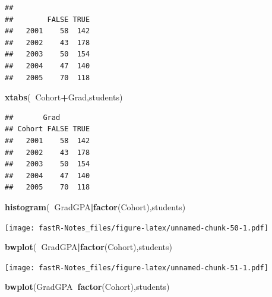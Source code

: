 \documentclass[]{book}
\newenvironment{Shaded}{\begin{snugshade}}{\end{snugshade}}
\newcommand{\KeywordTok}[1]{\textcolor[rgb]{0.13,0.29,0.53}{\textbf{#1}}}
\newcommand{\OperatorTok}[1]{\textcolor[rgb]{0.81,0.36,0.00}{\textbf{#1}}}
\newcommand{\NormalTok}[1]{#1}
\theoremstyle{definition}
\theoremstyle{definition}
\theoremstyle{definition}
\theoremstyle{remark}
\begin{document}
\begin{Shaded}
\end{Shaded}

\begin{verbatim}
##       
##        FALSE TRUE
##   2001    58  142
##   2002    43  178
##   2003    50  154
##   2004    47  140
##   2005    70  118
\end{verbatim}

\begin{Shaded}
\begin{Highlighting}[]
\KeywordTok{xtabs}\NormalTok{(}\OperatorTok{~}\NormalTok{Cohort}\OperatorTok{+}\NormalTok{Grad,students)}
\end{Highlighting}
\end{Shaded}

\begin{verbatim}
##       Grad
## Cohort FALSE TRUE
##   2001    58  142
##   2002    43  178
##   2003    50  154
##   2004    47  140
##   2005    70  118
\end{verbatim}

\begin{Shaded}
\begin{Highlighting}[]
\KeywordTok{histogram}\NormalTok{(}\OperatorTok{~}\NormalTok{GradGPA}\OperatorTok{|}\KeywordTok{factor}\NormalTok{(Cohort),students)}
\end{Highlighting}
\end{Shaded}

\texttt{[image: fastR-Notes\_files/figure-latex/unnamed-chunk-50-1.pdf]}

\begin{Shaded}
\begin{Highlighting}[]
\KeywordTok{bwplot}\NormalTok{(}\OperatorTok{~}\NormalTok{GradGPA}\OperatorTok{|}\KeywordTok{factor}\NormalTok{(Cohort),students)}
\end{Highlighting}
\end{Shaded}

\texttt{[image: fastR-Notes\_files/figure-latex/unnamed-chunk-51-1.pdf]}

\begin{Shaded}
\begin{Highlighting}[]
\KeywordTok{bwplot}\NormalTok{(GradGPA}\OperatorTok{~}\KeywordTok{factor}\NormalTok{(Cohort),students)}
\end{Highlighting}
\end{Shaded}
\end{document}
